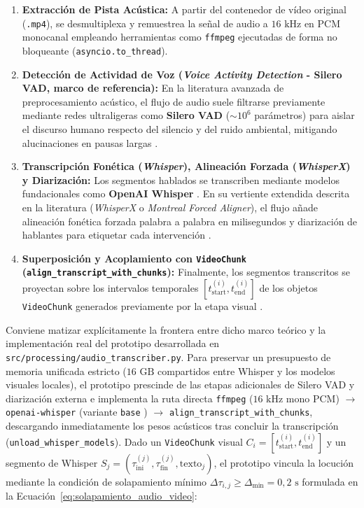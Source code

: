 \begin{enumerate}
    \item \textbf{Extracción de Pista Acústica:} A partir del contenedor de vídeo original (\texttt{.mp4}), se desmultiplexa y remuestrea la señal de audio a $16\text{ kHz}$ en PCM monocanal empleando herramientas como \texttt{ffmpeg} ejecutadas de forma no bloqueante (\texttt{asyncio.to\_thread}). %
    \item \textbf{Detección de Actividad de Voz (\textit{Voice Activity Detection} - Silero VAD, marco de referencia):} En la literatura avanzada de preprocesamiento acústico, el flujo de audio suele filtrarse previamente mediante redes ultraligeras como \textbf{Silero VAD} ($\sim 10^6$ parámetros) para aislar el discurso humano respecto del silencio y del ruido ambiental, mitigando alucinaciones en pausas largas \cite{whisperx_silero, mixpeek_chunking}. %
    \item \textbf{Transcripción Fonética (\textit{Whisper}), Alineación Forzada (\textit{WhisperX}) y Diarización:} Los segmentos hablados se transcriben mediante modelos fundacionales como \textbf{OpenAI Whisper} \cite{radford2023whisper}. En su vertiente extendida descrita en la literatura (\textit{WhisperX} o \textit{Montreal Forced Aligner}), el flujo añade alineación fonética forzada palabra a palabra en milisegundos y diarización de hablantes para etiquetar cada intervención \cite{whisperx_silero, mixpeek_chunking}. %
    \item \textbf{Superposición y Acoplamiento con \texttt{VideoChunk} (\texttt{align\_transcript\_with\_chunks}):} Finalmente, los segmentos transcritos se proyectan sobre los intervalos temporales $[t_{\text{start}}^{(i)}, t_{\text{end}}^{(i)}]$ de los objetos \texttt{VideoChunk} generados previamente por la etapa visual \cite{mixpeek_chunking}. %
\end{enumerate}

Conviene matizar explícitamente la frontera entre dicho marco teórico y la implementación real del prototipo desarrollada en \texttt{src/processing/audio\_transcriber.py}. Para preservar un presupuesto de memoria unificada estricto ($16\text{ GB}$ compartidos entre Whisper y los modelos visuales locales), el prototipo prescinde de las etapas adicionales de Silero VAD y diarización externa e implementa la ruta directa \texttt{ffmpeg} ($16\text{ kHz}$ mono PCM) $\to$ \texttt{openai-whisper} (variante \texttt{base} \cite{radford2023whisper}) $\to$ \texttt{align\_transcript\_with\_chunks}, descargando inmediatamente los pesos acústicos tras concluir la transcripción (\texttt{unload\_whisper\_models}). Dado un \texttt{VideoChunk} visual $C_i = [t_{\text{start}}^{(i)}, t_{\text{end}}^{(i)}]$ y un segmento de Whisper $S_j = (\tau_{\text{ini}}^{(j)}, \tau_{\text{fin}}^{(j)}, \text{texto}_j)$, el prototipo vincula la locución mediante la condición de solapamiento mínimo $\Delta \tau_{i,j} \ge \Delta_{\min} = 0,2\text{ s}$ formulada en la Ecuación~\eqref{eq:solapamiento_audio_video}: %

